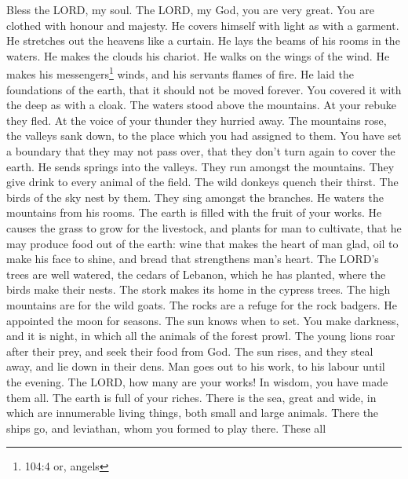  Bless the LORD, my soul. The LORD, my God, you are very
great. You are clothed with honour and majesty.  He covers
himself with light as with a garment. He stretches out the heavens like
a curtain.  He lays the beams of his rooms in the waters. He
makes the clouds his chariot. He walks on the wings of the wind.
 He makes his messengers\footnote{104:4 or, angels} winds,
and his servants flames of fire.  He laid the foundations of
the earth, that it should not be moved forever.  You covered
it with the deep as with a cloak. The waters stood above the mountains.
 At your rebuke they fled. At the voice of your thunder they
hurried away.  The mountains rose, the valleys sank down, to
the place which you had assigned to them.  You have set a
boundary that they may not pass over, that they don't turn again to
cover the earth.  He sends springs into the valleys. They
run amongst the mountains.  They give drink to every animal
of the field. The wild donkeys quench their thirst.  The
birds of the sky nest by them. They sing amongst the branches.
 He waters the mountains from his rooms. The earth is
filled with the fruit of your works.  He causes the grass
to grow for the livestock, and plants for man to cultivate, that he may
produce food out of the earth:  wine that makes the heart
of man glad, oil to make his face to shine, and bread that strengthens
man's heart.  The LORD's trees are well watered, the cedars
of Lebanon, which he has planted,  where the birds make
their nests. The stork makes its home in the cypress trees.
 The high mountains are for the wild goats. The rocks are a
refuge for the rock badgers.  He appointed the moon for
seasons. The sun knows when to set.  You make darkness, and
it is night, in which all the animals of the forest prowl. 
The young lions roar after their prey, and seek their food from God.
 The sun rises, and they steal away, and lie down in their
dens.  Man goes out to his work, to his labour until the
evening.  The LORD, how many are your works! In wisdom, you
have made them all. The earth is full of your riches. 
There is the sea, great and wide, in which are innumerable living
things, both small and large animals.  There the ships go,
and leviathan, whom you formed to play there.  These all
